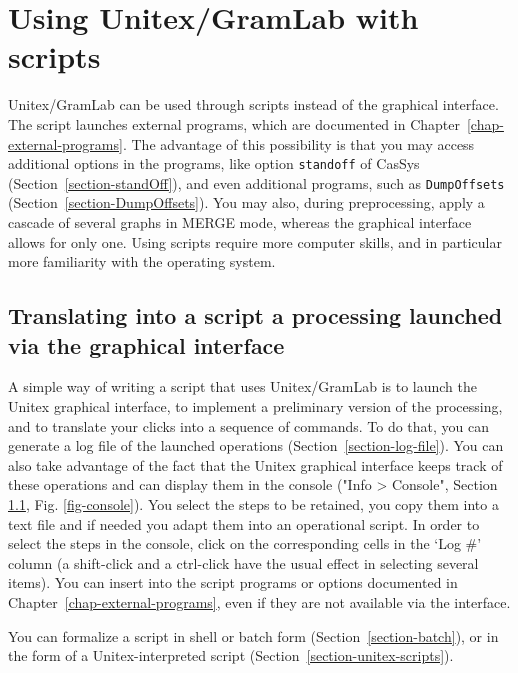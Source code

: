 \chapter{Using Unitex/GramLab with scripts}
\label{chap-scripts}

Unitex/GramLab can be used through scripts instead of the graphical interface.
The script launches external programs, which are documented in
Chapter~\ref{chap-external-programs}. The advantage of this possibility is that you may
access additional options in the programs, like option \verb$standoff$ of CasSys
(Section~\ref{section-standOff}), and even additional programs, such as
\verb$DumpOffsets$ (Section~\ref{section-DumpOffsets}). You may also, during preprocessing,
apply a cascade of several graphs in MERGE mode, whereas the graphical interface allows for only one.
Using scripts require more computer skills, and in particular more familiarity with the operating system.



\section{Translating into a script a processing launched via the graphical interface}
\label{section-console}

A simple way of writing a script that uses Unitex/GramLab is to launch the Unitex graphical interface,
to implement a preliminary version of the processing, and to translate your clicks into a sequence of commands.
To do that, you can generate a log file of the launched operations (Section~\ref{section-log-file}).
You can also take advantage of the fact that the Unitex graphical interface keeps track of these operations
and can display them in the
console ("Info > Console", Section \ref{section-console}, Fig. \ref{fig-console}). You select the steps
to be retained, you copy them into a text file and if needed you adapt them into an operational script.
In order to select the steps in the console, click on the corresponding cells in the `Log \#' column
(a shift-click and a ctrl-click have the usual effect in selecting several items).
You can insert into the script programs or options documented in
Chapter~\ref{chap-external-programs}, even if they are not available via the interface.

\bigskip
\noindent You can formalize a script in shell or batch form (Section~\ref{section-batch}),
or in the form of a Unitex-interpreted script (Section~\ref{section-unitex-scripts}).



